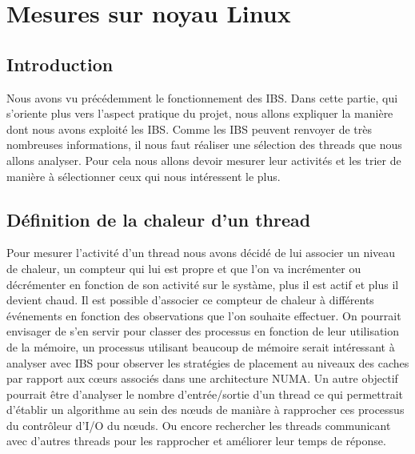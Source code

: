\chapter{Mesures sur noyau Linux}
	\section{Introduction}
		Nous avons vu précédemment le fonctionnement des IBS. Dans cette partie, qui s'oriente plus vers l'aspect pratique du projet, nous allons expliquer la manière dont nous avons exploité les IBS. Comme les IBS peuvent renvoyer de très nombreuses informations, il nous faut réaliser une sélection des threads que nous allons analyser. Pour cela nous allons devoir mesurer leur activités et les trier de manière à sélectionner ceux qui nous intéressent le plus.
	\section{Définition de la chaleur d'un thread}
		Pour mesurer l'activité d'un thread nous avons décidé de lui associer un niveau de chaleur, un compteur qui lui est propre et que l'on va incrémenter ou décrémenter en fonction de son activité sur le systàme, plus il est actif et plus il devient chaud. Il est possible d'associer ce compteur de chaleur à différents événements en fonction des observations que l'on souhaite effectuer. On pourrait envisager de s'en servir pour classer des processus en fonction de leur utilisation de la mémoire, un processus utilisant beaucoup de mémoire serait intéressant à analyser avec IBS pour observer les stratégies de placement au niveaux des caches par rapport aux cœurs associés dans une architecture NUMA. Un autre objectif pourrait être d'analyser le nombre d'entrée/sortie d'un thread ce qui permettrait d'établir un algorithme au sein des nœuds de maniàre à rapprocher ces processus du contrôleur d'I/O du nœuds. Ou encore rechercher les threads communicant avec d'autres threads pour les rapprocher et améliorer leur temps de réponse.
